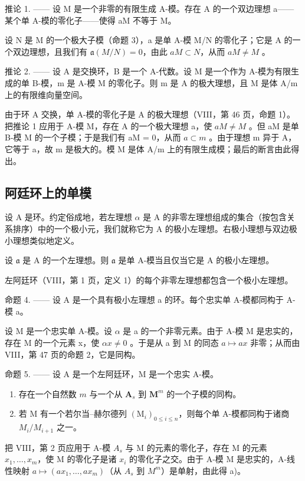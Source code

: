 推论 1. —— 设 M 是一个非零的有限生成 A-模。存在 A 的一个双边理想 a——某个单 A-模的零化子——使得 aM 不等于 M。

设 N 是 M 的一个极大子模（命题 3），a 是单 A-模 M/N 的零化子；它是 A 的一个双边理想，且我们有 \(\mathfrak{a}(M/N)=0\)，由此 \(aM\subset N\)，从而 \(aM\neq M\) 。

推论 2. —— 设 A 是交换环，B 是一个 A-代数。设 M 是一个作为 A-模为有限生成的单 B-模，m 是 A-模 M 的零化子。则 m 是 A 的极大理想，且 M 是体 A/m 上的有限维向量空间。

由于环 A 交换，单 A-模的零化子是 A 的极大理想（VIII，第 46 页，命题 1）。把推论 1 应用于 A-模 M，存在 A 的一个极大理想 a，使 \(aM \neq M\) 。但 aM 是单 B-模 M 的一个子模；于是我们有 aM = 0，从而 \(a \subset m\) 。由于理想 m 异于 A，它等于 a，故 m 是极大的。模 M 是体 A/m 上的有限生成模；最后的断言由此得出。

\subsection{阿廷环上的单模}

设 A 是环。约定俗成地，若左理想 \(\alpha\) 是 A 的非零左理想组成的集合（按包含关系排序）中的一个极小元，我们就称它为 A 的极小左理想。右极小理想与双边极小理想类似地定义。

设 \(\mathfrak{a}\) 是 A 的一个左理想。则 \(\mathfrak{a}\) 是单 A-模当且仅当它是 A 的极小左理想。

左阿廷环（VIII，第 1 页，定义 1）的每个非零左理想都包含一个极小左理想。

命题 4. —— 设 A 是一个具有极小左理想 a 的环。每个忠实单 A-模都同构于 A-模 a。

设 M 是一个忠实单 A-模。设 \(\alpha\) 是 a 的一个非零元素。由于 A-模 M 是忠实的，存在 M 的一个元素 x，使 \(\alpha x \neq 0\) 。于是从 a 到 M 的同态 \(a \mapsto ax\) 非零；从而由 VIII，第 47 页的命题 2，它是同构。

命题 5. —— 设 A 是一个左阿廷环，M 是一个忠实 A-模。

\begin{enumerate}
\def\labelenumi{\alph{enumi})}
\item
  存在一个自然数 \(m\) 与一个从 \(\mathbf{A}_s\) 到 \(\mathbf{M}^m\) 的一个子模的同构。
\item
  若 M 有一个若尔当–赫尔德列 \((\mathrm{M}_{i})_{0\leqslant i\leqslant n}\)，则每个单 A-模都同构于诸商 \(M_{i}/M_{i+1}\) 之一。
\end{enumerate}

把 VIII，第 2 页应用于 A-模 \(A_{s}\) 与 M 的元素的零化子，存在 M 的元素 \(x_{1},\ldots,x_{m}\)，使 M 的零化子是诸 \(x_{i}\) 的零化子之交。由于 A-模 M 是忠实的，A-线性映射 \(a\mapsto(ax_{1},\ldots,ax_{m})\)（从 \(A_{s}\) 到 \(M^{m}\)）是单射，由此得 a)。

